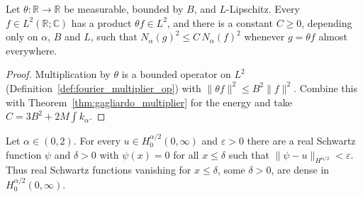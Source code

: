 \begin{lemma}\label{lem:gagliardo_n2_mul}
\leanok
Let $\theta : \mathbb{R} \to \mathbb{R}$ be measurable, bounded by $B$, and $L$-Lipschitz. Every $f \in L^2(\mathbb{R}; \mathbb{C})$ has a product $\theta f \in L^2$, and there is a constant $C \ge 0$, depending only on $\alpha$, $B$ and $L$, such that $N_\alpha(g)^2 \le C\, N_\alpha(f)^2$ whenever $g = \theta f$ almost everywhere.
\end{lemma}

\begin{proof}
\leanok
Multiplication by $\theta$ is a bounded operator on $L^2$ (Definition~\ref{def:fourier_multiplier_op}) with $\lVert \theta f \rVert^2 \le B^2 \lVert f \rVert^2$. Combine this with Theorem~\ref{thm:gagliardo_multiplier} for the energy and take $C = 3B^2 + 2M \int k_\alpha$.
\end{proof}

\begin{theorem}\label{thm:restricted_density}
\leanok
Let $\alpha \in (0, 2)$. For every $u \in H^{\alpha/2}_0(0, \infty)$ and $\varepsilon > 0$ there are a real Schwartz function $\psi$ and $\delta > 0$ with $\psi(x) = 0$ for all $x \le \delta$ such that $\lVert \psi - u \rVert_{H^{\alpha/2}} < \varepsilon$. Thus real Schwartz functions vanishing for $x \le \delta$, some $\delta > 0$, are dense in $H^{\alpha/2}_0(0, \infty)$.
\end{theorem}

